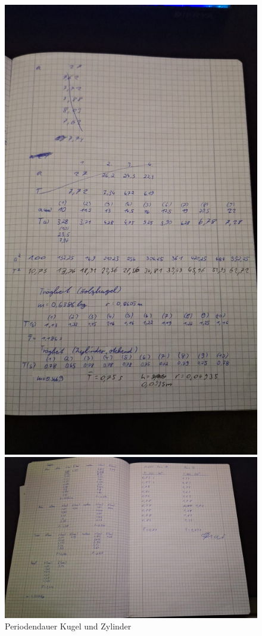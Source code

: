 \begin{figure}[h]
\begin{minipage}{0.45\textwidth}
        \includegraphics[width=\textwidth]{Bilder/messwerte3.jpg}
        \caption{Periodendauer Kugel und Zylinder}
    \end{minipage}
    \hfill
    \begin{minipage}{0.45\textwidth}
        \centering
        \includegraphics[width=\textwidth]{Bilder/messwerte4.jpg}

\end{minipage}
\end{figure}
